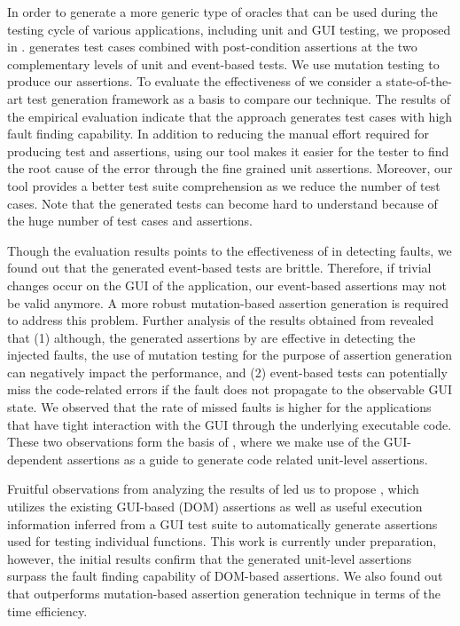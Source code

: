  In order to generate a more generic type of oracles that can be used during the testing cycle of various applications, including unit and GUI testing, we proposed \jseft in . \jseft generates test cases combined with post-condition assertions at the two complementary levels of unit and event-based tests. We use mutation testing to produce our assertions. 
To evaluate the effectiveness of \jseft we consider a state-of-the-art \javascript test generation framework as a basis to compare our technique. The results of the empirical evaluation indicate that the approach generates test cases with high fault finding capability. In addition to reducing the manual effort required for producing test and assertions, using our tool makes it easier for the tester to find the root cause of the error through the fine grained unit assertions. Moreover, our tool provides a better test suite comprehension as we reduce the number of test cases. Note that the generated tests can become hard to understand because of the huge number of test cases and assertions.

Though the evaluation results points to the effectiveness of \jseft in detecting faults, we found out that the generated event-based tests are brittle. Therefore, if trivial changes occur on the GUI of the application, our event-based assertions may not be valid anymore. A more robust mutation-based assertion generation is required to address this problem.
Further analysis of the results obtained from \jseft revealed that (1) although, the generated assertions by \jseft are effective in detecting the injected faults, the use of mutation testing for the purpose of assertion generation can negatively impact the performance, and (2) event-based tests can potentially miss the code-related errors if the fault does not propagate to the observable GUI state. We observed that the rate of missed faults is higher for the applications that have tight interaction with the GUI through the underlying executable code. These two observations form the basis of , where we make use of the GUI-dependent assertions as a guide to generate code related unit-level assertions.

 Fruitful observations from analyzing the results of \jseft led us to propose \atrina, which utilizes the existing GUI-based (\ie DOM) assertions as well as useful execution information inferred from a GUI test suite to automatically generate assertions used for testing individual functions. This work is currently under preparation, however, the initial results confirm that the generated unit-level assertions surpass the fault finding capability of DOM-based assertions. We also found out that \atrina outperforms mutation-based assertion generation technique in terms of the time efficiency.


